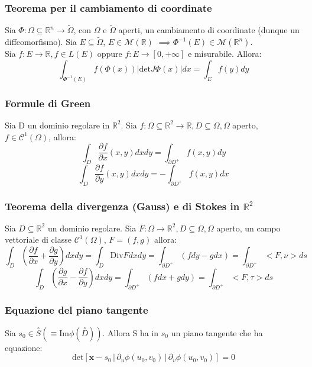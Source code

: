\documentclass{article} %
\begin{document}
    \subsubsection*{Teorema per il cambiamento di coordinate}
    Sia $\Phi:\Omega \subseteq \mathbb{R}^n \to \tilde{\Omega} $, con $\Omega$ e $\tilde{\Omega}$ aperti, un cambiamento di coordinate (dunque un diffeomorfismo). Sia $E \subseteq \tilde{\Omega}$, $E \in \mathcal{M}(\mathbb{R})$ $\implies \Phi^{-1}(E) \in \mathcal{M}(\mathbb{R}^n)$.\\
    Sia $f:E \to \mathbb{R}, f \in L(E)$ oppure $f:E \to [0,+\infty]$ e misurabile. Allora:
    $$\int_{\Phi^{-1}(E)}f(\Phi (x)) \left| \text{det} J \Phi (x) \right| dx = \int_E f(y) dy$$

    \subsubsection*{Formule di Green}
    Sia D un dominio regolare in $\mathbb{R}^2$. Sia $f: \Omega \subseteq \mathbb{R}^2 \to \mathbb{R}, D \subseteq \Omega, \Omega$ aperto, $f \in \mathcal{C}^1(\Omega)$, allora: \\
    $$\int_D \frac{\partial f}{\partial x}(x,y) dx dy = \int_{\partial D^+} f(x,y) dy$$
    $$\int_D \frac{\partial f}{\partial y}(x,y) dx dy = - \int_{\partial D^+} f(x,y) dx$$

    \subsubsection*{Teorema della divergenza (Gauss) e di Stokes in $\mathbb{R}^2$}
    Sia $D \subseteq \mathbb{R}^2$ un dominio regolare. Sia $F: \Omega \to \mathbb{R} ^2, D \subseteq \Omega, \Omega$ aperto, un campo vettoriale di classe $\mathcal{C}^1(\Omega)$, $F=(f,g)$ allora: \\
    $$ \int_D \left( \frac{\partial f}{ \partial x} + \frac{\partial g}{ \partial y} \right) dx dy = \int_D \text{Div} F dx dy = \int_{\partial D^+} (f dy - g dx) = \int_{\partial D ^+} < F , \nu > ds $$
    $$ \int_D \left( \frac{\partial g}{ \partial x} - \frac{\partial f}{ \partial y} \right) dx dy = \int_{\partial D^+} (f dx + g dy) = \int_{\partial D ^+} < F , \tau > ds $$

    \subsubsection*{Equazione del piano tangente}
    Sia $s_0 \in \overset{\circ}{S} \left(\equiv \text{Im} \phi\left(\overset{\circ}{D}\right)\right)$. Allora S ha in $s_0$ un piano tangente che ha equazione:
    $$ \text{det} \left[{ \mathbf{x}} - s_0 \, | \, \partial_u \phi (u_0, v_0) \, | \, \partial_v \phi (u_0, v_0) \right] = 0$$
\end{document}
